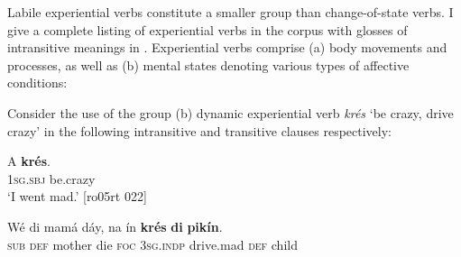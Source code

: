 Labile experiential verbs constitute a smaller group than change-of-state verbs. I give a complete listing of experiential verbs in the corpus with glosses of intransitive meanings in . Experiential verbs comprise (a) body movements and processes, as well as (b) mental states denoting various types of affective conditions:


Consider the use of the group (b) dynamic experiential verb \textit{krés} ‘be crazy, drive crazy’ in the following intransitive  and transitive  clauses respectively: 


\ea%
    \label{ex:key:1126}
    \gll \MakeUppercase{A}   \textbf{krés}.\\
\textsc{1sg.sbj}  be.crazy\\

\glt ‘I went mad.’ [ro05rt 022]
\z


\ea%
    \label{ex:key:1127}
    \gll Wé  di  mamá  dáy,    na  ín    \textbf{krés}    \textbf{di}  \textbf{pikín}.\\
\textsc{sub}  \textsc{def}  mother  die    \textsc{foc}  \textsc{3sg.indp}  drive.mad  \textsc{def}  child\\


